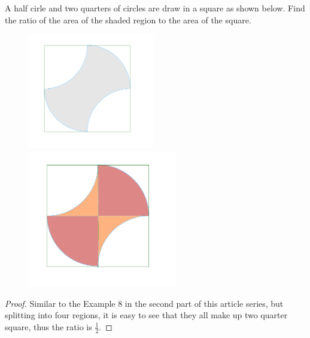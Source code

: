 \documentclass{article}
\begin{document}
\newpage

\begin{example*}[Example 17]
    A half cirle and two quarters of circles are draw in a square as shown below.
    Find the ratio of the area of the shaded region to the area of the square.
\end{example*}

\begin{figure}[h]
    \centering
    \begin{minipage}[t]{6.5cm}
        \begin{center}
            \includegraphics[width=5.5cm]{./svg/pdf/23-24-s3-i-p18.pdf}
        \end{center}
    \end{minipage}
    \qquad
    \begin{minipage}[t]{6.5cm}
        \centering
        \begin{center}
            \includegraphics[width=6.5cm]{./svg/pdf/23-24-s3-i-p18-s.pdf}
        \end{center}
    \end{minipage}
\end{figure}

\begin{proof}
    Similar to the Example 8 in the second part of this article series,
    but splitting into four regions, it is easy to see that they all make up two quarter square,
    thus the ratio is $\frac{1}{2}.$ 
\end{proof}
\end{document}
